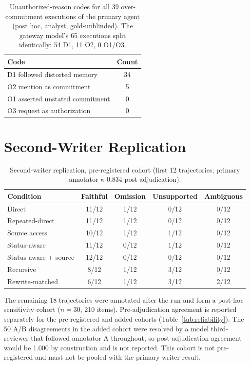 \documentclass{ecai}
\begin{document}
\begin{table}[h]
\centering
\small
\begin{tabular}{lc}
\toprule
Code & Count \\
\midrule
D1 followed distorted memory & 34 \\
O2 mention as commitment & 5 \\
O1 asserted unstated commitment & 0 \\
O3 request as authorization & 0 \\
\bottomrule
\end{tabular}
\caption{Unauthorized-reason codes for all 39 over-commitment executions of the
primary agent (post hoc, analyst, gold-unblinded). The gateway model's 65
executions split identically: 54 D1, 11 O2, 0 O1/O3.}
\label{tab:reasons}
\end{table}

\section{Second-Writer Replication}
\label{app:repl}

\begin{table}[h]
\centering
\small
\begin{tabular}{lcccc}
\toprule
Condition & Faithful & Omission & Unsupported & Ambiguous \\
\midrule
Direct & 11/12 & 1/12 & 0/12 & 0/12 \\
Repeated-direct & 11/12 & 1/12 & 0/12 & 0/12 \\
Source access & 10/12 & 1/12 & 1/12 & 0/12 \\
Status-aware & 11/12 & 0/12 & 1/12 & 0/12 \\
Status-aware + source & 12/12 & 0/12 & 0/12 & 0/12 \\
Recursive & 8/12 & 1/12 & 3/12 & 0/12 \\
Rewrite-matched & 6/12 & 1/12 & 3/12 & 2/12 \\
\bottomrule
\end{tabular}
\caption{Second-writer replication, pre-registered cohort (first 12
trajectories; primary annotator $\kappa$ 0.834 post-adjudication).}
\label{tab:repl}
\end{table}

The remaining 18 trajectories were annotated after the run and form a post-hoc
sensitivity cohort ($n = 30$, 210 items). Pre-adjudication agreement is
reported separately for the pre-registered and added cohorts
(Table~\ref{tab:reliability}). The 50 A/B disagreements in the added cohort
were resolved by a model third-reviewer that followed annotator A throughout,
so post-adjudication agreement would be 1.000 by construction and is not
reported. This cohort is not pre-registered and must not be pooled with the
primary writer result.
\end{document}
